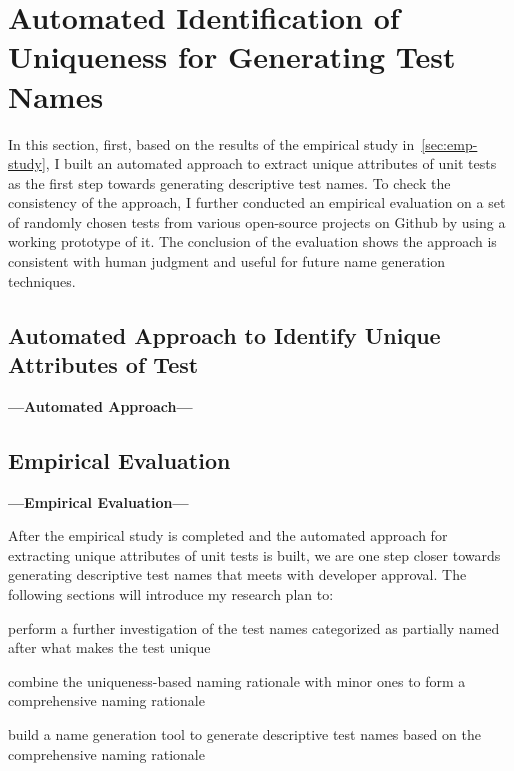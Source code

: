 \section{Automated Identification of Uniqueness for Generating Test Names}
\label{sec:uniquness-approach}

In this section, first, based on the results of the empirical study in~\cref{sec:emp-study}, I built an automated approach to extract unique attributes of unit tests as the first step towards generating descriptive test names.
%
To check the consistency of the approach, I further conducted an empirical evaluation on a set of randomly chosen tests from various open-source projects on Github by using a working prototype of it.
%
The conclusion of the evaluation shows the approach is consistent with human judgment and useful for future name generation techniques.

\subsection{Automated Approach to Identify Unique Attributes of Test}
\label{sec:auto-approach}
\textbf{---Automated Approach---}

\subsection{Empirical Evaluation}
\label{sec:emp-eval}
\textbf{---Empirical Evaluation---}


After the empirical study is completed and the automated approach for extracting unique attributes of unit tests is built, we are one step closer towards generating descriptive test names that meets with developer approval.
%
The following sections will introduce my research plan to:
\begin{enumerate*}
    \item perform a further investigation of the test names categorized as partially named after what makes the test unique
    \item combine the uniqueness-based naming rationale with minor ones to form a comprehensive naming rationale
    \item build a name generation tool to generate descriptive test names based on the comprehensive naming rationale 
\end{enumerate*}


